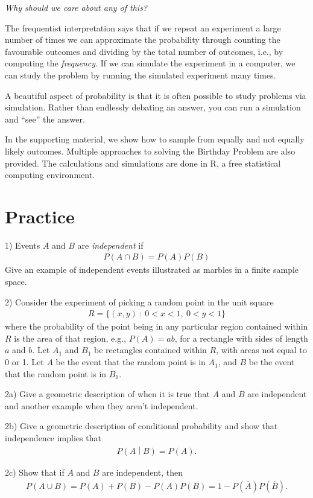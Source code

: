 \emph{Why should we care about any of this?}

The frequentist interpretation says that if we repeat an experiment a large number of times we can
approximate the probability through counting the favourable outcomes and dividing by the total number of outcomes, i.e.,
by computing the \emph{frequency}.
If we can simulate the experiment in a computer, 
we can study the problem by running the simulated experiment many times.

A beautiful aspect of probability is that it is often possible to study problems via simulation. 
Rather than endlessly debating an answer, 
you can run a simulation and ``see'' the answer. 

In the supporting material, 
we show how to sample from equally and not equally likely outcomes. 
Multiple approaches to solving the Birthday Problem are also provided. 
The calculations and simulations are done in R, 
a free statistical computing environment.

\section{Practice}\label{practice}

1) Events \(A\) and \(B\) are \emph{independent} if
\begin{align}
P(A \cap B) = P(A)P(B)
\end{align}
Give an example of independent events illustrated as marbles in a finite
sample space.

2) Consider the experiment of picking a random point in the unit square
\begin{align}
R = \{(x,y)\ :\ 0 < x < 1,\ 0 < y < 1\}
\end{align}
where the probability of the point being in any particular region
contained within \(R\) is the area of that region, e.g., \(P(A) = ab\),
for a rectangle with sides of length \(a\) and \(b\). Let \(A_{1}\) and
\(B_{1}\) be rectangles contained within \(R\), with areas not equal to
0 or 1. Let \(A\) be the event that the random point is in \(A_{1}\),
and \(B\) be the event that the random point is in \(B_{1}\).

2a) Give a geometric description of when it is true that \(A\) and \(B\)
are independent and another example when they aren't independent.

2b) Give a geometric description of conditional probability and show that
independence implies that
\begin{align}
P\left( A \middle| B \right) = P(A).
\end{align}

2c) Show that if \(A\) and \(B\) are independent, then
\begin{align}
P(A \cup B) = P(A) + P(B) - P(A)P(B) = 1 - P\left( \overline{A} \right)P(\overline{B}).
\end{align}






